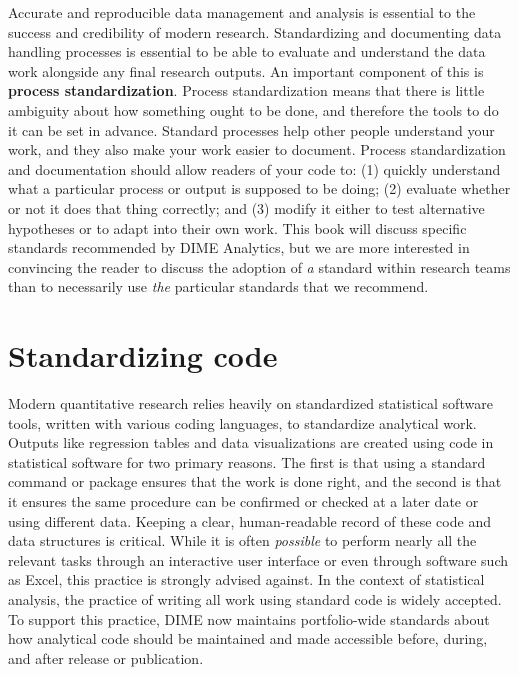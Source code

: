 Accurate and reproducible data management and analysis
is essential to the success and credibility of modern research.
Standardizing and documenting data handling processes is essential
to be able to evaluate and understand
the data work alongside any final research outputs.
An important component of this is \textbf{process standardization}.
Process standardization means that there is
little ambiguity about how something ought to be done,
and therefore the tools to do it can be set in advance.
Standard processes help other people understand your work,
and they also make your work easier to document.
Process standardization and documentation should allow readers of your code to:
(1) quickly understand what a particular process or output is supposed to be doing;
(2) evaluate whether or not it does that thing correctly; and
(3) modify it either to test alternative hypotheses or to adapt into their own work.
This book will discuss specific standards recommended by DIME Analytics,
but we are more interested in convincing the reader
to discuss the adoption of \textit{a} standard within research teams
than to necessarily use \textit{the} particular standards that we recommend.


\section{Standardizing code}

Modern quantitative research relies heavily
on standardized statistical software tools,
written with various coding languages, to standardize analytical work.
Outputs like regression tables and data visualizations
are created using code in statistical software for two primary reasons.
The first is that using a standard command or package ensures that the work is done right,
and the second is that it ensures the same procedure can be confirmed or checked
at a later date or using different data.
Keeping a clear, human-readable record of these code and data structures is critical.
While it is often \textit{possible} to perform nearly all the relevant tasks
through an interactive user interface or even through software such as Excel,
this practice is strongly advised against.
In the context of statistical analysis,
the practice of writing all work using standard code is widely accepted.
To support this practice, DIME now maintains portfolio-wide standards
about how analytical code should be maintained and made accessible
before, during, and after release or publication.

